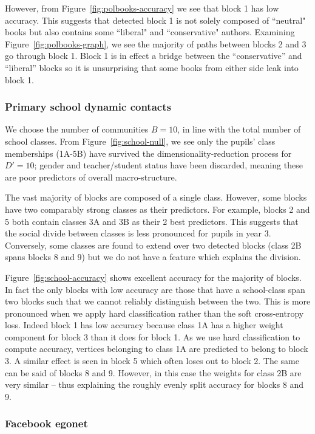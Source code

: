 However, from Figure~\ref{fig:polbooks-accuracy} we see that block 1 has low accuracy. 
This suggests that detected block 1 is not solely composed of ``neutral" books but also 
contains some ``liberal" and ``conservative" authors. Examining 
Figure~\ref{fig:polbooks-graph}, we see the majority of paths between blocks 2 and 3 go through block 1.
Block 1 is in effect a bridge between the ``conservative'' and ``liberal'' blocks so it is unsurprising that some books from either side leak into block 1.

\subsubsection{Primary school dynamic contacts}

We choose the number of communities $B=10$, in line with the total number of 
school classes. From Figure~\ref{fig:school-null}, we see only the pupils' class memberships (1A-5B) have survived
the dimensionality-reduction process for $D'=10$;
gender and teacher/student status have been discarded,
meaning these are poor predictors of overall macro-structure.

The vast majority of blocks are composed of a single class. 
However, some blocks have two comparably strong classes as their predictors. 
For example, blocks 2 and 5 both contain classes 3A and 3B as their 2 best predictors. 
This suggests that the social divide between classes is less pronounced 
for pupils in year 3. Conversely, some classes are found to extend over two 
detected blocks (class 2B spans blocks 8 and 9) but we do 
not have a feature which explains the division.

Figure~\ref{fig:school-accuracy} shows excellent accuracy for the majority of blocks. In fact the only blocks with low accuracy are those that have a school-class span two blocks such that we cannot reliably distinguish between the two. This is more pronounced when we apply hard classification rather than the soft cross-entropy loss. Indeed block 1 has low accuracy because class 1A has a higher weight component for block 3 than it does for block 1. As we use hard classification to compute accuracy, vertices belonging to class 1A are predicted to belong to block 3. A similar effect is seen in block 5 which often loses out to block 2. The same can be said of blocks 8 and 9. However, in this case the weights for class 2B are very similar -- thus explaining the roughly evenly split accuracy for blocks 8 and 9.

\subsubsection{Facebook egonet}

